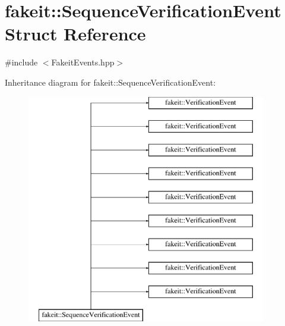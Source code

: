 \hypertarget{structfakeit_1_1SequenceVerificationEvent}{}\section{fakeit\+::Sequence\+Verification\+Event Struct Reference}
\label{structfakeit_1_1SequenceVerificationEvent}


{\ttfamily \#include $<$Fakeit\+Events.\+hpp$>$}

Inheritance diagram for fakeit\+::Sequence\+Verification\+Event\+:\begin{figure}[H]
\begin{center}
\leavevmode
\includegraphics[height=10.000000cm]{structfakeit_1_1SequenceVerificationEvent}
\end{center}
\end{figure}
